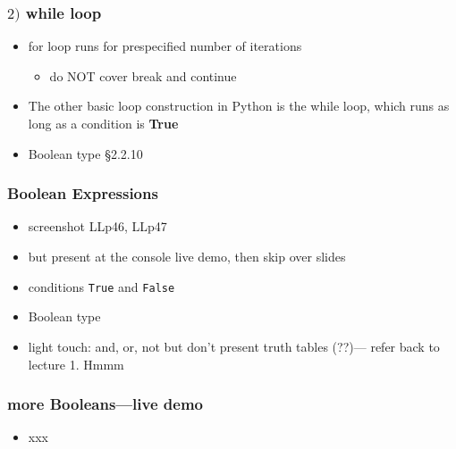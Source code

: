 \documentclass[english,14pt]{beamer}
\begin{document}
\begin{frame}[fragile]

\frametitle{$2)$ while loop}

\begin{itemize}
	\item for loop runs for prespecified number of iterations
	\begin{itemize}
		\item do NOT cover break and continue
	\end{itemize}
	\item The other basic loop construction in Python is the while loop, which runs as long as a condition is \textbf{True}
	\item Boolean type \S2.2.10
\end{itemize}

\end{frame}


\begin{frame}[fragile]

\frametitle{Boolean Expressions}

\begin{itemize}
	\item screenshot LLp46, LLp47
	\item but present at the console live demo, then skip over slides
	\item conditions \texttt{True} and \texttt{False}
	\item Boolean type
	\item light touch: and, or, not but don't present truth tables (??)--- refer back to lecture 1. Hmmm 
\end{itemize}

\end{frame}


\begin{frame}[fragile]

\frametitle{more Booleans---live demo}

\begin{itemize}
	\item xxx
\end{itemize}

\end{frame}

\end{document}
